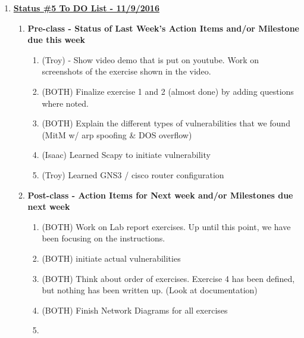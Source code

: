 \documentclass[main.tex]{subfiles}
\begin{document}
\begin{enumerate}[leftmargin=12mm,labelsep=0.1cm]
    \item[] \textbf{\Large \underline{Status \#5 To DO List - 11/9/2016}}
    \begin{enumerate}
        \item \textbf{Pre-class - Status of Last Week's Action Items and/or Milestone due this week}
        \begin{enumerate}
            \item (Troy) - Show video demo that is put on youtube. Work on screenshots of the exercise shown in the video. 
            \item (BOTH) Finalize exercise 1 and 2 (almost done) by adding questions where noted.
            \item (BOTH) Explain the different types of vulnerabilities that we found (MitM w/ arp spoofing & DOS overflow)
            \item (Isaac) Learned Scapy to initiate vulnerability
            \item (Troy) Learned GNS3 / cisco router configuration
        \end{enumerate}
        \item \textbf{Post-class - Action Items for Next week and/or Milestones due next week}
        \begin{enumerate}
            \item (BOTH) Work on Lab report exercises. Up until this point, we have been focusing on the instructions.
            \item (BOTH) initiate actual vulnerabilities
            \item (BOTH) Think about order of exercises. Exercise 4 has been defined, but nothing has been written up. (Look at documentation)
            \item (BOTH) Finish Network Diagrams for all exercises
            \item 
        \end{enumerate}
    \end{enumerate}
\end{enumerate}
\end{document}
